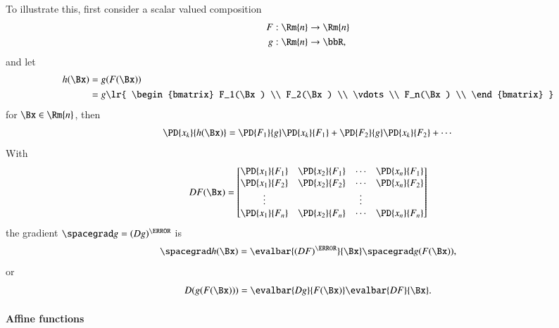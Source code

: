 To illustrate this, first consider a scalar valued composition
%
\begin{equation}\label{eqn:jacobianAndHessian:584}
\begin{aligned}
F &: \Rm{n} \rightarrow \Rm{n} \\
g &: \Rm{n} \rightarrow \bbR,
\end{aligned}
\end{equation}
%
and let
%
\begin{equation}\label{eqn:jacobianAndHessian:604}
\begin{aligned}
h(\Bx)
&= g(F(\Bx)) \\
&= g\lr{
\begin{bmatrix}
F_1(\Bx) \\
F_2(\Bx) \\
\vdots \\
F_n(\Bx) \\
\end{bmatrix}
}
\end{aligned}
\end{equation}
%
for \( \Bx \in \Rm{n} \), then
%
\begin{equation}\label{eqn:jacobianAndHessian:624}
\PD{x_k}{h(\Bx)}
=
\PD{F_1}{g}
\PD{x_k}{F_1}
+
\PD{F_2}{g}
\PD{x_k}{F_2}
+
\cdots
\end{equation}
%
With
%
\begin{equation}\label{eqn:jacobianAndHessian:644}
D F(\Bx)
=
\begin{bmatrix}
\PD{x_1}{F_1} & \PD{x_2}{F_1} & \cdots & \PD{x_n}{F_1} \\
\PD{x_1}{F_2} & \PD{x_2}{F_2} & \cdots & \PD{x_n}{F_2} \\
\vdots & & \vdots & \\
\PD{x_1}{F_n} & \PD{x_2}{F_n} & \cdots & \PD{x_n}{F_n} \\
\end{bmatrix}
\end{equation}
%
the gradient \( \spacegrad g = (D g)^\T \) is
%
\begin{equation}\label{eqn:jacobianAndHessian:664}
\spacegrad h(\Bx)
=
\evalbar{ (D F)^\T }{\Bx}
\spacegrad g(F(\Bx)),
\end{equation}
%
or
%
\begin{equation}\label{eqn:jacobianAndHessian:665}
D (g(F(\Bx)))
=
\evalbar{D g}{F(\Bx)}
\evalbar{D F}{\Bx}.
\end{equation}
%
\paragraph{Affine functions}

